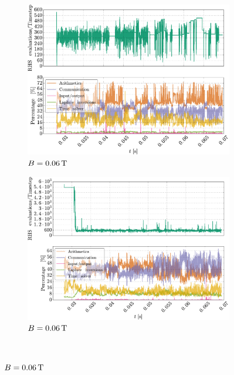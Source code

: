 \begin{figure}[htbp]
\begin{subfigure}[h]{0.45\textwidth}
        \label{fig:perf004}
    \end{subfigure}%
    \\
    \begin{subfigure}[h]{0.45\textwidth}
        \centering
        \includegraphics[width=1.0\textwidth]{fig/results/compareBouss/performance006B}
        \caption{$B=0.06\, \text{T}$}
        \label{fig:perf006B}
    \end{subfigure}
    \hfill
    \begin{subfigure}[h]{0.45\textwidth}
        \centering
        \includegraphics[width=1.0\textwidth]{fig/results/performance/performance006}
        \caption{$B=0.06\, \text{T}$}
        \label{fig:perf006}
    \end{subfigure}
    \\

\end{figure}
